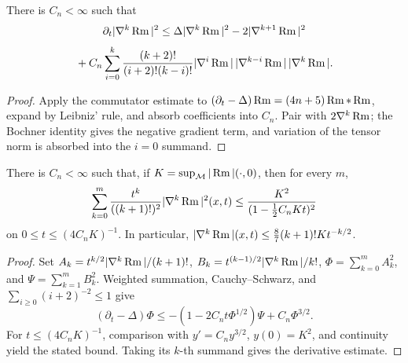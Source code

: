 \begin{lemma}
\label{lem:chow-ii-curvature-derivative-evolution-inequality}

There is \(C_n<\infty\) such that
\[
 \partial_t|\nabla^k\operatorname{Rm}|^2\leq\Delta|\nabla^k\operatorname{Rm}|^2
 -2|\nabla^{k+1}\operatorname{Rm}|^2
\]
\[
 {}+C_n\sum_{i=0}^k\frac{(k+2)!}{(i+2)!(k-i)!}
 |\nabla^i\operatorname{Rm}|\,|\nabla^{k-i}\operatorname{Rm}|\,|\nabla^k\operatorname{Rm}|.
\]
\end{lemma}
\begin{proof}
\sketch
{}
Apply the commutator estimate to
\((\partial_t-\Delta)\operatorname{Rm}=(4n+5)\operatorname{Rm}*\operatorname{Rm}\), expand by Leibniz' rule, and
absorb coefficients into \(C_n\).  Pair with \(2\nabla^k\operatorname{Rm}\); the Bochner
identity gives the negative gradient term, and variation of the tensor norm
is absorbed into the \(i=0\) summand.
\end{proof}

\begin{lemma}
\label{lem:chow-ii-main-factorial-curvature-estimate}

There is \(C_n<\infty\) such that, if
\(K=\sup_{\mathcal M}|\operatorname{Rm}|(\cdot,0)\), then for every \(m\),
\[
 \sum_{k=0}^m\frac{t^k}{((k+1)!)^2}|\nabla^k\operatorname{Rm}|^2(x,t)
 \leq\frac{K^2}{(1-\tfrac12C_nKt)^2}
\]
on \(0\leq t\leq(4C_nK)^{-1}\).  In particular,
\(|\nabla^k\operatorname{Rm}|(x,t)\leq\frac87(k+1)!Kt^{-k/2}\).
\end{lemma}
\begin{proof}
\sketch
{}
Set \(A_k=t^{k/2}|\nabla^k\operatorname{Rm}|/(k+1)!\),
\(B_k=t^{(k-1)/2}|\nabla^k\operatorname{Rm}|/k!\),
\(\Phi=\sum_{k=0}^mA_k^2\), and \(\Psi=\sum_{k=1}^mB_k^2\).
Weighted summation, Cauchy--Schwarz, and
\(\sum_{i\geq0}(i+2)^{-2}\leq1\) give
\[
 (\partial_t-\Delta)\Phi
 \leq-(1-2C_nt\Phi^{1/2})\Psi+C_n\Phi^{3/2}.
\]
For \(t\leq(4C_nK)^{-1}\), comparison with
\(y'=C_ny^{3/2}\), \(y(0)=K^2\), and continuity yield the stated bound.
Taking its \(k\)-th summand gives the derivative estimate.
\end{proof}

